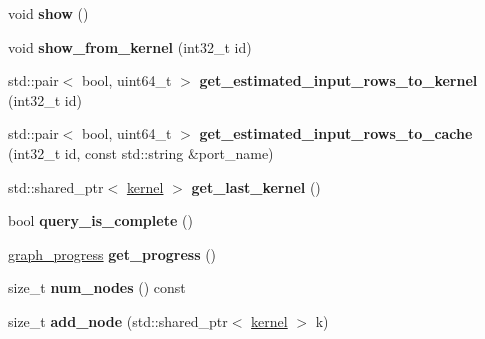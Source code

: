 \begin{DoxyCompactItemize}
void {\bfseries show} ()
\item 
\mbox{\label{classral_1_1cache_1_1graph_a8230c4d53a48789b0fb345c4728ee382}} 
void {\bfseries show\+\_\+from\+\_\+kernel} (int32\+\_\+t id)
\item 
\mbox{\label{classral_1_1cache_1_1graph_a450979fa83451a685cd01a3ff1d84fd3}} 
std\+::pair$<$ bool, uint64\+\_\+t $>$ {\bfseries get\+\_\+estimated\+\_\+input\+\_\+rows\+\_\+to\+\_\+kernel} (int32\+\_\+t id)
\item 
\mbox{\label{classral_1_1cache_1_1graph_a0a37303c30fe7e1cff0d503c64b5b9ea}} 
std\+::pair$<$ bool, uint64\+\_\+t $>$ {\bfseries get\+\_\+estimated\+\_\+input\+\_\+rows\+\_\+to\+\_\+cache} (int32\+\_\+t id, const std\+::string \&port\+\_\+name)
\item 
\mbox{\label{classral_1_1cache_1_1graph_ad932b42a4b61f60a01f203e06d6a4db6}} 
std\+::shared\+\_\+ptr$<$ \hyperlink{classral_1_1cache_1_1kernel}{kernel} $>$ {\bfseries get\+\_\+last\+\_\+kernel} ()
\item 
\mbox{\label{classral_1_1cache_1_1graph_a1b34d12b497e9b5a13ee5803cbac2b9c}} 
bool {\bfseries query\+\_\+is\+\_\+complete} ()
\item 
\mbox{\label{classral_1_1cache_1_1graph_ae6203c9457f340bb57ef88fdde3919df}} 
\hyperlink{structral_1_1cache_1_1graph__progress}{graph\+\_\+progress} {\bfseries get\+\_\+progress} ()
\item 
\mbox{\label{classral_1_1cache_1_1graph_a86b47f4e66c2933ec68808cedf1a7384}} 
size\+\_\+t {\bfseries num\+\_\+nodes} () const
\item 
\mbox{\label{classral_1_1cache_1_1graph_af295e159e82d778e8326303b9144c047}} 
size\+\_\+t {\bfseries add\+\_\+node} (std\+::shared\+\_\+ptr$<$ \hyperlink{classral_1_1cache_1_1kernel}{kernel} $>$ k)
\item 
\mbox{\label{classral_1_1cache_1_1graph_a28ebb545621a519d7deda12f6d1fb4d8}} 

\end{DoxyCompactItemize}
